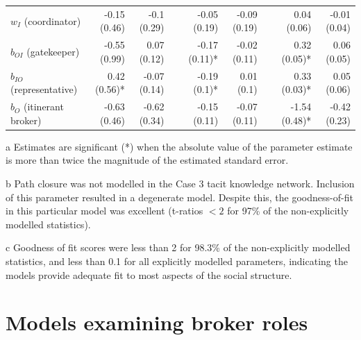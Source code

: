 \begin{table}
{\begin{threeparttable}
\begin{tabular}{@{}lrrlrrlrr@{}}
$w_I$ (coordinator) & -0.15 (0.46)\phantom{*} & -0.1 (0.29)\phantom{*} &  & -0.05 (0.19)\phantom{*} & -0.09 (0.19)\phantom{*} &  & 0.04 (0.06)\phantom{*} & -0.01 (0.04)\phantom{*} \\
$b_{OI}$ (gatekeeper) & -0.55 (0.99)\phantom{*} & 0.07 (0.12)\phantom{*} &  & -0.17 (0.11)* & -0.02 (0.11)\phantom{*} &  & 0.32 (0.05)* & 0.06 (0.05)\phantom{*} \\
$b_{IO}$ (representative) & 0.42 (0.56)* & -0.07 (0.14)\phantom{*} &  & -0.19 (0.1)* & 0.01 (0.1)\phantom{*} &  & 0.33 (0.03)* & 0.05 (0.06)\phantom{*} \\
$b_O$ (itinerant broker) & -0.63 (0.46)\phantom{*} & -0.62 (0.34)\phantom{*} &  & -0.15 (0.11)\phantom{*} & -0.07 (0.11)\phantom{*} &  & -1.54 (0.48)* & -0.42 (0.23)\phantom{*} \\
 \bottomrule
\end{tabular}
\begin{tablenotes}
\footnotesize
\item[a] Estimates are significant (*) when the absolute value of the parameter estimate is more than twice the magnitude of the estimated standard error.
\item[b] Path closure was not modelled in the Case 3 tacit knowledge network. Inclusion of this parameter resulted in a degenerate model. Despite this, the goodness-of-fit in this particular model was excellent (t-ratios $<2$ for 97\% of the non-explicitly modelled statistics).
\item[c] Goodness of fit scores were less than 2 for 98.3\% of the non-explicitly modelled statistics, and less than 0.1 for all explicitly modelled parameters, indicating the models provide adequate fit to most aspects of the social structure.

\end{tablenotes}

\end{threeparttable}
%
}
\end{table}

\section{Models examining broker roles}

